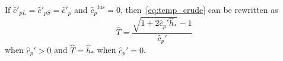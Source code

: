 \documentclass{article}
\newcommand{\dder}[2][]{\Delta_{#2}#1}
\DeclarePairedDelimiter\autobracket()       %
\newcommand{\br}[1]{\autobracket*{#1}}
\newcommand{\pert}[1]{\delta#1}
\newcommand{\diag}[1]{\left(#1\right)^\mathrm{diag}}
\newcommand{\fusion}[1]{{#1}^\mathrm{fus}}
\begin{document}
If \(\hat{c}'_{pL} = \hat{c}'_{pS} = \hat{c}'_p\) and \(\fusion{\hat{c}_{p}} = 0\),
then~\eqref{eq:temp_crude} can be rewritten as
\begin{equation}\label{eq:temperature}
	\hat{T} = \frac{\sqrt{1+2\hat{c}_p'\hat{h}_*}-1}{\hat{c}_p'}
\end{equation}
when \(\hat{c}_p'>0\) and \(\hat{T} = \hat{h}_*\) when \(\hat{c}_p'=0\).

\begin{comment}

For~\eqref{eq:heat_conduction_hats}, we can write
\begin{gather}
    F = \dder{\hat{x}_i}\br{
        \frac{1 - \hat{\psi}}{1 - \psi_0}
	    \frac{1 + \hat{k}'\hat{T}}{1 + 2\hat{c}_p'\hat{T}}
	    \dder[\hat{h}_*]{\hat{x}_i}
	}, \\
    \pert{F} = \dder{\hat{x}_i}\left[ \frac{1 - \hat{\psi}}{1 - \psi_0} \br{
	    \frac{(\hat{k}' - 2\hat{c}_p')\pert{\hat{h}_*}}{(1 + 2\hat{c}_p'\hat{T})^3}
	     \dder[\hat{h}_*]{\hat{x}_i}
	    +
	    \frac{1 + \hat{k}'\hat{T}}{1 + 2\hat{c}_p'\hat{T}}
	    \dder[\pert{\hat{h}_*}]{\hat{x}_i}
	}\right], \\
    \diag{\pert{F}} \approx \frac{1 - \hat{\psi}}{1 - \psi_0} \br{
	    \frac{\hat{k}' - 2\hat{c}_p'}{(1 + 2\hat{c}_p'\hat{T})^3} \dder[\hat{h}_*]{\hat{x}_i} \diag{\dder{\hat{x}_i}}
	    +
	    \frac{1 + \hat{k}'\hat{T}}{1 + 2\hat{c}_p'\hat{T}}
	    \diag{\dder{\hat{x}_i}^2}
	}\diag{\pert{\hat{h}_*}}.
\end{gather}
where
\begin{gather}
    \pert{\hat{h}_*} = \pert{\hat{h}} - \fusion{\hat{h}}\pert{\hat\phi}, \quad
    \diag{\hat{h}_*} = \diag{\pert{\hat{h}_*}} = 1 - \fusion{\hat{h}}\diag{\pert{\hat\phi}}, \\
	\pert{\hat{\phi}} = \begin{cases}
        0 & \quad \hat{h} \leq \hat{h}_S, \quad \hat{h}_L \leq \hat{h}, \\
        \pert{\hat{h}}/(\hat{h}_L-\hat{h}_S) & \quad \hat{h}_S < \hat{h} < \hat{h}_L, \\
    \end{cases} \label{eq:pert_phi_h}\\
	\diag{\pert{\hat{\phi}}} = \begin{cases}
        0 & \quad \hat{h} \leq \hat{h}_S, \quad \hat{h}_L \leq \hat{h}, \\
        1/(\hat{h}_L-\hat{h}_S) & \quad \hat{h}_S < \hat{h} < \hat{h}_L. \\
    \end{cases} \label{eq:pert_phi_h_diag}
\end{gather}


\end{comment}
\end{document}
